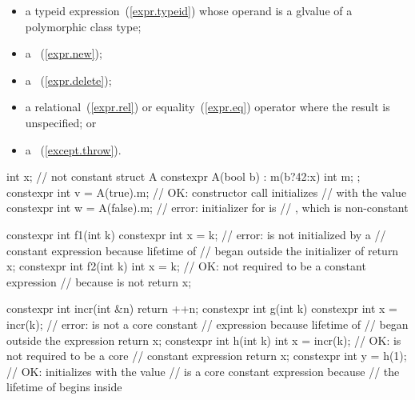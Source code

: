 \begin{itemize}
\item
a typeid expression~(\ref{expr.typeid}) whose operand is a glvalue of a
polymorphic class type;

\item
a ~(\ref{expr.new});

\item
a ~(\ref{expr.delete});

\item
a relational~(\ref{expr.rel}) or equality~(\ref{expr.eq})
operator where the result is unspecified; or

\item
a ~(\ref{except.throw}).
\end{itemize}

\enterexample
\begin{codeblock}
int x;                              // not constant
struct A {
  constexpr A(bool b) : m(b?42:x) { }
  int m;
};
constexpr int v = A(true).m;        // OK: constructor call initializes
                                    //  with the value 
constexpr int w = A(false).m;       // error: initializer for  is
                                    // , which is non-constant

constexpr int f1(int k) {
  constexpr int x = k;              // error:  is not initialized by a
                                    // constant expression because lifetime of 
                                    // began outside the initializer of 
  return x;
}
constexpr int f2(int k) {
  int x = k;                        // OK: not required to be a constant expression
                                    // because  is not 
  return x;
}

constexpr int incr(int &n) {
  return ++n;
}
constexpr int g(int k) {
  constexpr int x = incr(k);        // error:  is not a core constant
                                    // expression because lifetime of 
                                    // began outside the expression 
  return x;
}
constexpr int h(int k) {
  int x = incr(k);                  // OK:  is not required to be a core
                                    // constant expression
  return x;
}
constexpr int y = h(1);             // OK: initializes  with the value 
                                    //  is a core constant expression because
                                    // the lifetime of  begins inside 
\end{codeblock}
\exitexample

